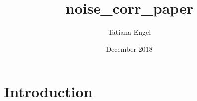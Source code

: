 \documentclass{article}
\title{noise_corr_paper}
\author{Tatiana Engel}
\date{December 2018}
\begin{document}
\maketitle

\section{Introduction}
\end{document}
